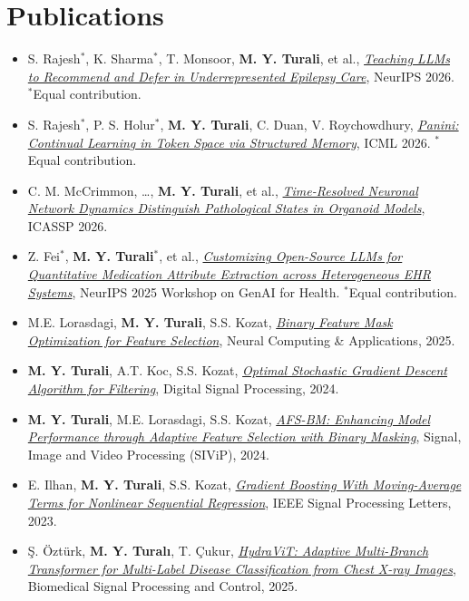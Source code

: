 \documentclass[letterpaper,10pt]{article}
\begin{document}
\hspace{0.06\textwidth} %
\begin{minipage}[t]{0.34\textwidth}

\section{Publications}
\small
\begin{itemize}[leftmargin=0in, itemsep=1pt]
  \item S. Rajesh$^{*}$, K. Sharma$^{*}$, T. Monsoor, \textbf{M. Y. Turali}, et al., \href{https://arxiv.org/abs/2606.31036}{\emph{Teaching LLMs to Recommend and Defer in Underrepresented Epilepsy Care}}, NeurIPS 2026. {\footnotesize $^{*}$Equal contribution.}
  \item S. Rajesh$^{*}$, P. S. Holur$^{*}$, \textbf{M. Y. Turali}, C. Duan, V. Roychowdhury, \href{https://arxiv.org/abs/2602.15156}{\emph{Panini: Continual Learning in Token Space via Structured Memory}}, ICML 2026. {\footnotesize $^{*}$Equal contribution.}
  \item C. M. McCrimmon, \ldots, \textbf{M. Y. Turali}, et al., \href{https://doi.org/10.1109/ICASSP55912.2026.11461496}{\emph{Time-Resolved Neuronal Network Dynamics Distinguish Pathological States in Organoid Models}}, ICASSP 2026.
  \item Z. Fei$^{*}$, \textbf{M. Y. Turali}$^{*}$, et al., \href{https://neurips.cc/}{\emph{Customizing Open-Source LLMs for Quantitative Medication Attribute Extraction across Heterogeneous EHR Systems}}, NeurIPS 2025 Workshop on GenAI for Health. {\footnotesize $^{*}$Equal contribution.}
  \item M.E. Lorasdagi, \textbf{M. Y. Turali}, S.S. Kozat, \href{https://doi.org/10.1007/s00521-024-10913-9}{\emph{Binary Feature Mask Optimization for Feature Selection}}, Neural Computing \& Applications, 2025.
  \item \textbf{M. Y. Turali}, A.T. Koc, S.S. Kozat, \href{https://doi.org/10.1016/j.dsp.2024.104731}{\emph{Optimal Stochastic Gradient Descent Algorithm for Filtering}}, Digital Signal Processing, 2024.
  \item \textbf{M. Y. Turali}, M.E. Lorasdagi, S.S. Kozat, \href{https://doi.org/10.1007/s11760-024-03411-x}{\emph{AFS-BM: Enhancing Model Performance through Adaptive Feature Selection with Binary Masking}}, Signal, Image and Video Processing (SIViP), 2024.
  \item E. Ilhan, \textbf{M. Y. Turali}, S.S. Kozat, \href{https://doi.org/10.1109/LSP.2023.3309577}{\emph{Gradient Boosting With Moving-Average Terms for Nonlinear Sequential Regression}}, IEEE Signal Processing Letters, 2023.
  \item Ş. Öztürk, \textbf{M. Y. Turalı}, T. Çukur, \href{https://doi.org/10.1016/j.bspc.2024.106959}{\emph{HydraViT: Adaptive Multi-Branch Transformer for Multi-Label Disease Classification from Chest X-ray Images}}, Biomedical Signal Processing and Control, 2025.
\end{itemize}
\normalsize


\end{minipage}
\end{document}

